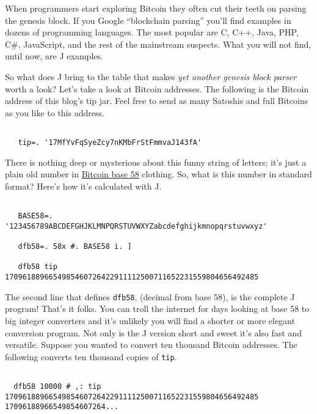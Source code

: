 When programmers start exploring Bitcoin they often cut their teeth on
parsing the genesis block. If you Google ``blockchain parsing'' you'll
find examples in dozens of programming languages. The most popular are
C, C++, Java, PHP, C\#, JavaScript, and the rest of the mainstream
suspects. What you will not find, until now, are J examples.

So what does J bring to the table that makes \emph{yet another genesis
block parser} worth a look? Let's take a look at Bitcoin addresses. The
following is the Bitcoin address of this blog's tip jar. Feel free to
send as many Satoshis and full Bitcoins as you like to this address.

\begin{lstlisting}[language=jdoc, frame=single,framerule=0pt,label=lst:scr4754X0a]

   tip=. '17MfYvFqSyeZcy7nKMbFrStFmmvaJ143fA'
\end{lstlisting}

There is nothing deep or mysterious about this funny string of letters;
it's just a plain old number in
\href{https://en.bitcoin.it/wiki/Base58Check_encoding}{Bitcoin base 58}
clothing. So, what is this number in standard format? Here's how it's
calculated with J.

\begin{lstlisting}[language=jdoc, frame=single,framerule=0pt,label=lst:scr4754X0b]

   BASE58=. '123456789ABCDEFGHJKLMNPQRSTUVWXYZabcdefghijkmnopqrstuvwxyz'
 
   dfb58=. 58x #. BASE58 i. ]
 
   dfb58 tip
1709618896654985460726422911112500711652231559804656492485
\end{lstlisting}

The second line that defines \texttt{dfb58}, (decimal from base 58), is
the complete J program! That's it folks. You can troll the internet for
days looking at base 58 to big integer converters and it's unlikely you
will find a shorter or more elegant conversion program. Not only is the
J version short and sweet it's also fast and versatile. Suppose you
wanted to convert ten thousand Bitcoin addresses. The following converts
ten thousand copies of \texttt{tip}.

\begin{lstlisting}[language=jdoc, frame=single,framerule=0pt,label=lst:scr4754X0c]

  dfb58 10000 # ,: tip
1709618896654985460726422911112500711652231559804656492485 17096188966549854607264...
\end{lstlisting}

